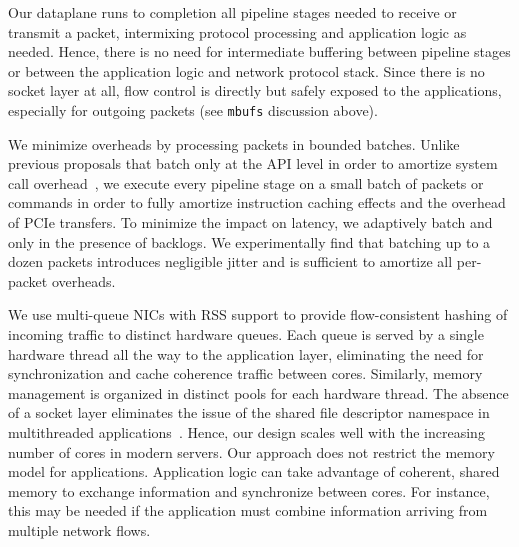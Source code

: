 

 Our dataplane 
runs to completion all pipeline stages needed to receive or transmit a
packet, intermixing protocol processing and application logic as
needed. Hence, there is no need for intermediate buffering between
pipeline stages or between the application logic and network protocol
stack. Since there is no socket layer at all, flow control is directly
but safely exposed to the applications, especially for outgoing
packets (see \texttt{mbufs} discussion  above).

We minimize overheads by processing packets in bounded batches.
Unlike previous proposals that batch only at the API level in order to
amortize system call overhead~\cite{jeong2014mtcp,han2012megapipe}, we
execute every pipeline stage on a small batch of packets or commands
in order to fully amortize instruction caching effects and the
overhead of PCIe transfers. To minimize the impact on latency, we
adaptively batch and only in the presence of backlogs. We
experimentally find that batching up to a dozen 
packets introduces negligible jitter and is sufficient to amortize all
per-packet overheads.


 We use multi-queue
NICs with RSS support to provide flow-consistent hashing of incoming
traffic to distinct hardware queues. Each queue is served by a single
hardware thread all the way to the application layer, eliminating the
need for synchronization and cache coherence traffic between
cores. Similarly, memory management is organized in distinct pools for
each hardware thread. The absence of a socket layer eliminates the
issue of the shared file descriptor namespace in multithreaded applications~\cite{DBLP:conf/sosp/ClementsKZMK13}. Hence,
our design scales well with the increasing number of cores in modern
servers. Our approach does not restrict the memory model for
applications. Application logic can take advantage of coherent, shared
memory to exchange information and synchronize between cores. For
instance, this may be needed if the application must combine
information arriving from multiple network flows.



